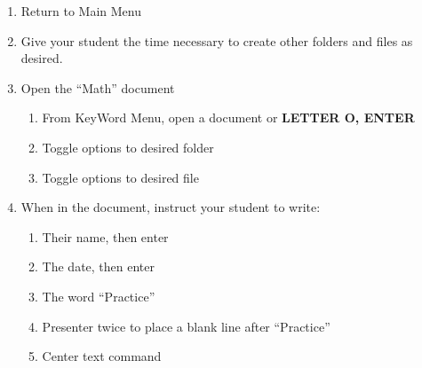 \documentclass[10pt,letterpaper,twoside]{report}
\begin{document}
{{{\begin{enumerate}
\begin{enumerate}
	\end{enumerate}
	\item Return to Main Menu 
	\item Give your student the time necessary to create other folders and files as desired.
	\item Open the ``Math'' document
	\begin{enumerate}
	    \item From KeyWord Menu, open a document   or {\textcolor{accent}{\MakeUppercase{\textbf{letter o, enter}}}}
	    \item Toggle options to desired folder  
	    \item Toggle options to desired file  
	\end{enumerate}
	\item When in the document, instruct your student to write:
    	    \begin{enumerate} 
    	    \item Their name, then enter
    	    \item The date, then enter
    	    \item The word ``Practice'' 
    	    \item Presenter twice to place a blank line after ``Practice''
    	    \item Center text command 
    	    

\end{enumerate}
\end{enumerate}}}}
\end{document}
